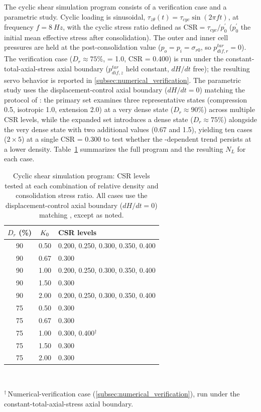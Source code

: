 The cyclic shear simulation program consists of a verification case and a parametric \Kzero{} study. Cyclic loading is sinusoidal, $\tau_{z\theta}(t) = \tau_{cyc}\sin(2\pi f t)$, at frequency $f = \SI{8}{Hz}$, with the cyclic stress ratio defined as $\mathrm{CSR} = \tau_{cyc}/p_0^{\prime}$ ($p_0^{\prime}$ the initial mean effective stress after consolidation). The outer and inner cell pressures are held at the post-consolidation value ($p_o=p_i=\sigma_{r0}$, so $p_{dif,r}^{tar}=0$). The verification case ($D_r \approx 75\%$, \Kzero{} = 1.0, CSR = 0.400) is run under the constant-total-axial-stress axial boundary ($p_{dif,z}^{tar}$ held constant, $dH/dt$ free); the resulting servo behavior is reported in \cref{subsec:numerical_verification}. The parametric \Kzero{} study uses the displacement-control axial boundary ($dH/dt=0$) matching the protocol of \citet{Ishihara1985}: the primary set examines three representative \Kzero{} states (compression 0.5, isotropic 1.0, extension 2.0) at a very dense state ($D_r \approx 90\%$) across multiple CSR levels, while the expanded set introduces a dense state ($D_r \approx 75\%$) alongside the very dense state with two additional \Kzero{} values (0.67 and 1.5), yielding ten cases ($2 \times 5$) at a single CSR = 0.300 to test whether the \Kzero{}-dependent trend persists at a lower density. Table~\ref{tab:case_matrix} summarizes the full program and the resulting $N_L$ for each case.

\begin{table}[t]
  \centering
  \caption{Cyclic shear simulation program: CSR levels tested at each combination of relative density and consolidation stress ratio. All cases use the displacement-control axial boundary ($dH/dt=0$) matching \citet{Ishihara1985}, except as noted.}
  \label{tab:case_matrix}
  \begin{tabular}{@{}ccl@{}}
    \toprule
    $D_r$ (\%) & $K_0$ & CSR levels \\
    \midrule
    90 & 0.50 & 0.200, 0.250, 0.300, 0.350, 0.400 \\
    90 & 0.67 & 0.300 \\
    90 & 1.00 & 0.200, 0.250, 0.300, 0.350, 0.400 \\
    90 & 1.50 & 0.300 \\
    90 & 2.00 & 0.200, 0.250, 0.300, 0.350, 0.400 \\
    \midrule
    75 & 0.50 & 0.300 \\
    75 & 0.67 & 0.300 \\
    75 & 1.00 & 0.300, 0.400$^{\dagger}$ \\
    75 & 1.50 & 0.300 \\
    75 & 2.00 & 0.300 \\
    \bottomrule
  \end{tabular}\\[2pt]
  \begin{minipage}{0.95\linewidth}
    \footnotesize $^{\dagger}$\,Numerical-verification case (\cref{subsec:numerical_verification}), run under the constant-total-axial-stress axial boundary.
  \end{minipage}
\end{table}

